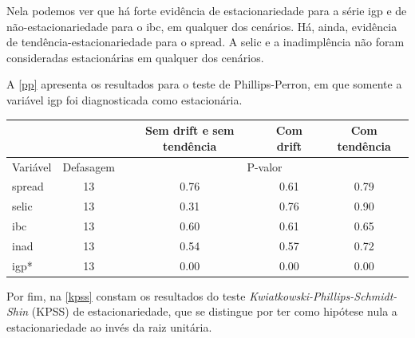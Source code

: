 \documentclass[a4paper,
               article,
               12pt,
               openany,
               oneside,
               english,
               brazil]{abntex2}
\numberwithin{equation}{section}
\begin{document}
    Nela podemos ver que há forte evidência de estacionariedade para a série igp e de não-estacionariedade para o ibc, em qualquer dos cenários. Há, ainda, evidência de tendência-estacionariedade para o spread. A selic e a inadimplência não foram consideradas estacionárias em qualquer dos cenários.

    A \autoref{pp} apresenta os resultados para o teste de Phillips-Perron, em que somente a variável igp foi diagnosticada como estacionária.

    \begin{table}[ht]
        {%
            \begin{tabular}{lcccc}
                \midrule
                &           & \multicolumn{1}{C{3cm}}{Sem drift e sem tendência} & \multicolumn{1}{C{3cm}}{Com drift} & \multicolumn{1}{C{3cm}}{Com tendência} \\
                \midrule
                Variável & Defasagem & \multicolumn{3}{c}{P-valor} \\
                \midrule
                spread     &         13 &     0.76 &     0.61 &     0.79 \\
                selic      &         13 &     0.31 &     0.76 &     0.90 \\
                ibc        &         13 &     0.60 &     0.61 &     0.65 \\
                inad       &         13 &     0.54 &     0.57 &     0.72 \\
                igp*        &         13 &     0.00 &     0.00 &     0.00 \\
                \midrule
            \end{tabular}
            } 
            {}
    \end{table}

    Por fim, na \autoref{kpss} constam os resultados do teste \textit{Kwiatkowski-Phillips-Schmidt-Shin} (KPSS) de estacionariedade, que se distingue por ter como hipótese nula a estacionariedade ao invés da raiz unitária.
\end{document}
